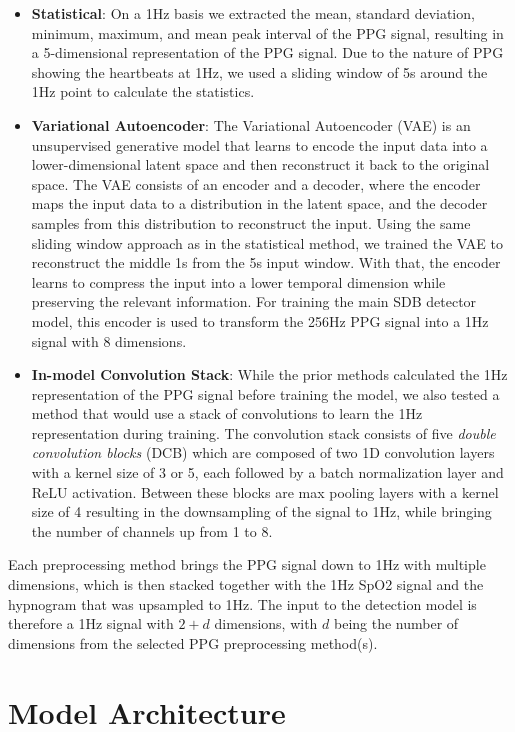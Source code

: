\begin{itemize}
    \item \textbf{Statistical}: On a 1Hz basis we extracted the mean, standard deviation, minimum, maximum, and mean peak interval of the PPG signal, resulting in a 5-dimensional representation of the PPG signal. Due to the nature of PPG showing the heartbeats at 1Hz, we used a sliding window of 5s around the 1Hz point to calculate the statistics.
    \item \textbf{Variational Autoencoder}: The Variational Autoencoder (VAE) is an unsupervised generative model that learns to encode the input data into a lower-dimensional latent space and then reconstruct it back to the original space. The VAE consists of an encoder and a decoder, where the encoder maps the input data to a distribution in the latent space, and the decoder samples from this distribution to reconstruct the input. Using the same sliding window approach as in the statistical method, we trained the VAE to reconstruct the middle 1s from the 5s input window. With that, the encoder learns to compress the input into a lower temporal dimension while preserving the relevant information. For training the main SDB detector model, this encoder is used to transform the 256Hz PPG signal into a 1Hz signal with 8 dimensions.
    \item \textbf{In-model Convolution Stack}: While the prior methods calculated the 1Hz representation of the PPG signal before training the model, we also tested a method that would use a stack of convolutions to learn the 1Hz representation during training. The convolution stack consists of five \textit{double convolution blocks} (DCB) which are composed of two 1D convolution layers with a kernel size of 3 or 5, each followed by a batch normalization layer and ReLU activation. Between these blocks are max pooling layers with a kernel size of 4 resulting in the downsampling of the signal to 1Hz, while bringing the number of channels up from 1 to 8.
\end{itemize}

Each preprocessing method brings the PPG signal down to 1Hz with multiple dimensions, which is then stacked together with the 1Hz SpO2 signal and the hypnogram that was upsampled to 1Hz. The input to the detection model is therefore a 1Hz signal with $2+d$ dimensions, with $d$ being the number of dimensions from the selected PPG preprocessing method(s). 

\section{Model Architecture}

